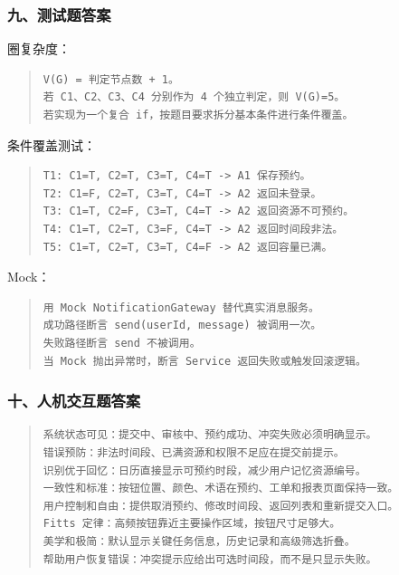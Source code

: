 \documentclass[UTF8,zihao=-4]{ctexart}
\begin{document}
\subsubsection*{九、测试题答案}


圈复杂度：


\begin{quote}
\footnotesize
\begin{verbatim}
V(G) = 判定节点数 + 1。
若 C1、C2、C3、C4 分别作为 4 个独立判定，则 V(G)=5。
若实现为一个复合 if，按题目要求拆分基本条件进行条件覆盖。
\end{verbatim}
\end{quote}


条件覆盖测试：


\begin{quote}
\footnotesize
\begin{verbatim}
T1: C1=T, C2=T, C3=T, C4=T -> A1 保存预约。
T2: C1=F, C2=T, C3=T, C4=T -> A2 返回未登录。
T3: C1=T, C2=F, C3=T, C4=T -> A2 返回资源不可预约。
T4: C1=T, C2=T, C3=F, C4=T -> A2 返回时间段非法。
T5: C1=T, C2=T, C3=T, C4=F -> A2 返回容量已满。
\end{verbatim}
\end{quote}


Mock：


\begin{quote}
\footnotesize
\begin{verbatim}
用 Mock NotificationGateway 替代真实消息服务。
成功路径断言 send(userId, message) 被调用一次。
失败路径断言 send 不被调用。
当 Mock 抛出异常时，断言 Service 返回失败或触发回滚逻辑。
\end{verbatim}
\end{quote}


\subsubsection*{十、人机交互题答案}


\begin{quote}
\footnotesize
\begin{verbatim}
系统状态可见：提交中、审核中、预约成功、冲突失败必须明确显示。
错误预防：非法时间段、已满资源和权限不足应在提交前提示。
识别优于回忆：日历直接显示可预约时段，减少用户记忆资源编号。
一致性和标准：按钮位置、颜色、术语在预约、工单和报表页面保持一致。
用户控制和自由：提供取消预约、修改时间段、返回列表和重新提交入口。
Fitts 定律：高频按钮靠近主要操作区域，按钮尺寸足够大。
美学和极简：默认显示关键任务信息，历史记录和高级筛选折叠。
帮助用户恢复错误：冲突提示应给出可选时间段，而不是只显示失败。
\end{verbatim}
\end{quote}
\end{document}
